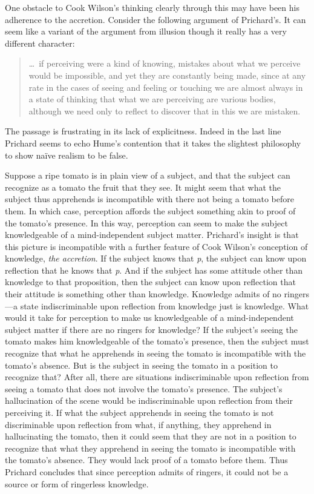 \documentclass[12pt]{article}
\begin{document}
One obstacle to Cook Wilson's thinking clearly through this may have been his adherence to the accretion. Consider the following argument of Prichard's. It can seem like a variant of the argument from illusion though it really has a very different character:
\begin{quote}
	\ldots\ if perceiving were a kind of knowing, mistakes about what we perceive would be impossible, and yet they are constantly being made, since at any rate in the cases of seeing and feeling or touching we are almost always in a state of thinking that what we are perceiving are various bodies, although we need only to reflect to discover that in this we are mistaken. \citep[11]{Prichard:1938ve}
\end{quote}
The passage is frustrating in its lack of explicitness. Indeed in the last line Prichard seems to echo Hume’s \citeyearpar[§\textsc{xii}]{Hume:1748zr} contention that it takes the slightest philosophy to show naïve realism to be false. 

Suppose a ripe tomato is in plain view of a subject, and that the subject can recognize as a tomato the fruit that they see. It might seem that what the subject thus apprehends is incompatible with there not being a tomato before them. In which case, perception affords the subject something akin to proof of the tomato's presence. In this way, perception can seem to make the subject knowledgeable of a mind-independent subject matter. Prichard's insight is that this picture is incompatible with a further feature of Cook Wilson's conception of knowledge, \emph{the accretion}. If the subject knows that \emph{p}, the subject can know upon reflection that he knows that \emph{p}. And if the subject has some attitude other than knowledge to that proposition, then the subject can know upon reflection that their attitude is something other than knowledge. Knowledge admits of no ringers---a state indiscriminable upon reflection from knowledge just is knowledge. What would it take for perception to make us knowledgeable of a mind-independent subject matter if there are no ringers for knowledge? If the subject's seeing the tomato makes him knowledgeable of the tomato's presence, then the subject must recognize that what he apprehends in seeing the tomato is incompatible with the tomato's absence. But is the subject in seeing the tomato in a position to recognize that? After all, there are situations indiscriminable upon reflection from seeing a tomato that does not involve the tomato's presence. The subject's hallucination of the scene would be indiscriminable upon reflection from their perceiving it. If what the subject apprehends in seeing the tomato is not discriminable upon reflection from what, if anything, they apprehend in hallucinating the tomato, then it could seem that they are not in a position to recognize that what they apprehend in seeing the tomato is incompatible with the tomato's absence. They would lack proof of a tomato before them. Thus Prichard concludes that since perception admits of ringers, it could not be a source or form of ringerless knowledge.
\end{document}
